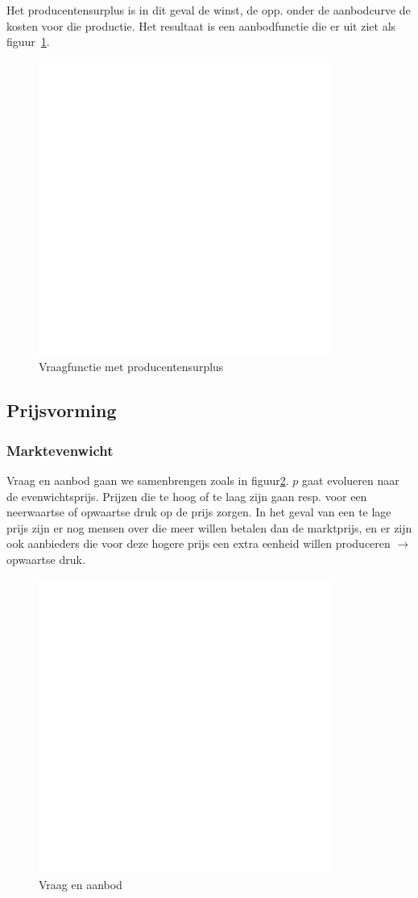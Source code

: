 Het producentensurplus is in dit geval de winst, de opp. onder de aanbodcurve de kosten voor die productie. Het resultaat is een aanbodfunctie die er uit ziet als figuur~\ref{fig:aanbodfunc}.
\begin{figure}[htbp]
	\centering
	\includegraphics[scale=0.4]{Images/white.png}
	\caption{Vraagfunctie met producentensurplus}
	\label{fig:aanbodfunc}
\end{figure}


\subsection{Prijsvorming}
\subsubsection{Marktevenwicht}
Vraag en aanbod gaan we samenbrengen zoals in figuur\ref{fig:vraagenaanbod}. $p$ gaat evolueren naar de evenwichtsprijs. Prijzen die te hoog of te laag zijn gaan resp. voor een neerwaartse of opwaartse druk op de prijs zorgen. In het geval van een te lage prijs zijn er nog mensen over die meer willen betalen dan de marktprijs, en er zijn ook aanbieders die voor deze hogere prijs een extra eenheid willen produceren $\rightarrow$ opwaartse druk.
\begin{figure}[htbp]
	\centering
	\includegraphics[scale=0.4]{Images/white.png}
	\caption{Vraag en aanbod}
	\label{fig:vraagenaanbod}
\end{figure}

